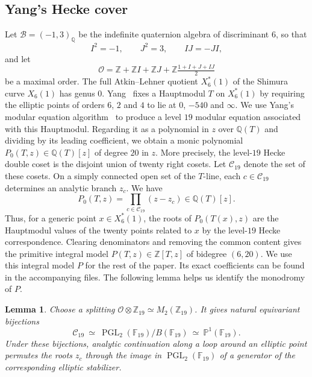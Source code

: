 \documentclass[10pt]{amsart}
\numberwithin{equation}{section}
\newtheorem{lemma}[theorem]{Lemma}
\theoremstyle{definition}
\theoremstyle{remark}
\newcommand{\PP}{\mathbb P}
\newcommand{\F}{\mathbb{F}}
\newcommand{\Q}{\mathbb{Q}}
\newcommand{\Z}{\mathbb{Z}}
\newcommand{\PGL}{\operatorname{PGL}}
\begin{document}
  

\subsection{Yang's Hecke cover}\label{subsec:l19-yang}
Let $\mathcal B=(-1,3)_\Q$ be the indefinite quaternion algebra of
discriminant $6$,
so that
\[
 I^2=-1,\qquad J^2=3,\qquad IJ=-JI ,
\]
and let
\[
 \mathcal O=\Z+\Z I+\Z J+\Z\tfrac{1+I+J+IJ}{2}
\]
be a maximal order.  The full Atkin--Lehner quotient $X_6^*(1)$ of the Shimura curve $X_6(1)$ has
genus $0$.  Yang~\cite{YangSchwarzian} fixes a Hauptmodul $T$ on $X_6^*(1)$ by requiring the
elliptic points of orders $6$, $2$ and $4$ to lie at $0$, $-540$ and
$\infty$. We use Yang's modular equation algorithm~\cite{YangModularEquations} to produce a level $19$ modular equation associated with this Hauptmodul. Regarding it as a polynomial in $z$ over $\Q(T)$ and dividing by its leading coefficient, we obtain a monic polynomial $P_0(T,z)\in\Q(T)[z]$ of degree $20$ in $z$. 
 More precisely, the level-$19$ Hecke double coset is the disjoint union of twenty right cosets. Let $\mathcal C_{19}$ denote the set of these cosets. On a simply connected open
set of the $T$-line, each $c\in\mathcal C_{19}$ determines an analytic branch $z_c$. We have 
\begin{equation}\label{eq:yang-defining-product}
 P_0(T,z)=\prod_{c\in\mathcal C_{19}}(z-z_c)\in\Q(T)[z].
\end{equation}
Thus, for a generic point $x\in X_6^*(1)$, the roots of
  $P_0(T(x),z)$ are the Hauptmodul values of the twenty points related to $x$ by the level-$19$ Hecke correspondence. Clearing denominators and removing the common content gives the primitive
integral model $P(T,z)\in\Z[T,z]$ of bidegree $(6,20)$. We use this integral model $P$ for the rest of the paper. Its exact coefficients can be found in the accompanying files. The following lemma helps us identify the monodromy of $P$.



\begin{lemma}\label{lem:l19-hecke-cosets}
Choose a splitting $\mathcal O\otimes\Z_{19}\simeq M_2(\Z_{19})$. It
gives natural equivariant bijections
\[
 \mathcal C_{19}\ \simeq\
 \PGL_2(\F_{19})/B(\F_{19})\ \simeq\ \PP^1(\F_{19}).
\] 
Under these bijections, analytic continuation along a loop around an elliptic
point permutes the roots $z_c$ through the image in $\PGL_2(\F_{19})$ of a
generator of the corresponding elliptic stabilizer.
\end{lemma}
\end{document}
